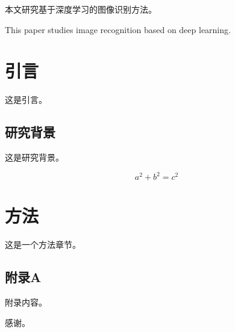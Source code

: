 \documentclass{sduthesis}
\begin{document}
\frontmatter
\makecoverpage

\begin{cnabstract}
本文研究基于深度学习的图像识别方法。
\end{cnabstract}

\begin{enabstract}
This paper studies image recognition based on deep learning.
\end{enabstract}

\maketable

\mainmatter
\chapter{引言}
这是引言。

\section{研究背景}
这是研究背景。

\begin{equation}
  a^2 + b^2 = c^2
\end{equation}

\chapter{方法}
这是一个方法章节。

\begin{myappendix}
\chapter{附录A}
附录内容。
\end{myappendix}

\backmatter

\begin{myacknowledgement}
感谢。
\end{myacknowledgement}
\end{document}
